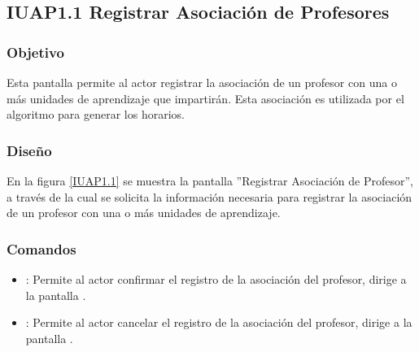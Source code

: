 \subsection{IUAP1.1 Registrar Asociación de Profesores}

\subsubsection{Objetivo}
	Esta pantalla permite al actor registrar la asociación de un profesor con una o más unidades de aprendizaje que impartirán. Esta asociación es utilizada por el algoritmo para generar los horarios.

\subsubsection{Diseño}

    En la figura \ref{IUAP1.1} se muestra la pantalla ''Registrar Asociación de Profesor'', a través de la cual se solicita la información necesaria para registrar la asociación de un profesor con una o más unidades de aprendizaje.
 

\subsubsection{Comandos}
    \begin{itemize}
	\item {}: Permite al actor confirmar el registro de la asociación del profesor, dirige a la pantalla .
	
	\item {}: Permite al actor cancelar el registro de la asociación del profesor, dirige a la pantalla .
    \end{itemize}
